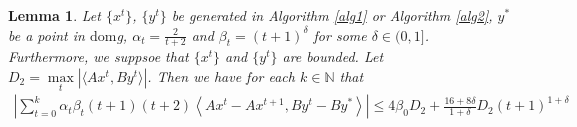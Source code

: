 \documentclass{article}
\numberwithin{equation}{section}
\newtheorem{lemma}{Lemma}[section]
\begin{document}
\begin{lemma} \label{lemma_of_sum_Axk-Axk+1}
    Let  $\{x^t\}$, $\{y^t\}$ be generated in Algorithm \ref{alg1} or Algorithm \ref{alg2}, $y^*$ be a point 
    in $\mathrm{dom}$g, $\alpha_t = \frac{2}{t+2}$ and $\beta_{t} =(t+1)^{\delta}$ for some $\delta \in (0,1]$. 
    Furthermore, we suppsoe that $\{x^t\}$ and $\{y^t\}$ are bounded. Let $D_2 =\max\limits_t \left| \langle Ax^t,By^t \rangle \right|$. 
    Then we have for each $k\in\mathbb{N}$ that  
    \begin{align}
        \left| \sum\limits_{t = 0}^k\alpha_t\beta_{t}(t+1)(t+2)\left\langle Ax^t- Ax^{t+1},By^t-By^* \right\rangle \right| 
        \leq 4\beta_0D_2 +\frac{16+8\delta}{1+\delta}D_2(t+1)^{1+\delta} \nonumber
    \end{align}
\end{lemma}
\end{document}
